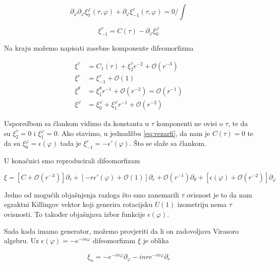 \begin{equation*}
\partial_\varphi\partial_\varphi\xi^\varphi_0(\tau,\varphi)+\partial_\varphi\xi^r_{-1}(\tau,\varphi)=0\Big/ \int
\end{equation*}

\begin{equation}
\xi^r_{-1}=C(\tau)-\partial_\varphi\xi^\varphi_0
\label{eq:vezarfi}
\end{equation}

\noindent Na kraju možemo napisati zasebne komponente difeomorfizma

\begin{equation}
\begin{split}
\xi^\tau&=C_1(\tau)+\xi^\tau_2r^{-2}+\mathcal{O}(r^{-3})\\
\xi^r&=\xi^r_{-1}+\mathcal{O}(1)\\
\xi^\theta&=\xi^\theta_1r^{-1}+\mathcal{O}(r^{-2})=\mathcal{O}(r^{-1})\\
\xi^\varphi&=\xi^\varphi_0+\xi^\varphi_1r^{-1}+\mathcal{O}(r^{-2})
\end{split}
\end{equation}

\noindent Usporedbom sa člankom \citep{Guica:2008mu} vidimo da konstanta u $\tau$ komponenti ne ovisi o $\tau$, te da su $\xi^\tau_2=0$ i $\xi^\varphi_1=0$. Ako stavimo, u jednadžbu \eqref{eq:vezarfi}, da nam je $C(\tau)=0$ te da su  $\xi^\varphi_0=\epsilon(\varphi)$ tada je $\xi^r_{-1}=-\epsilon'(\varphi)$. Što se slaže sa člankom. 

\noindent U konačnici smo reproducirali difeomorfizam

\begin{equation}
\xi=[C+\mathcal{O}(r^{-3})]\partial_\tau+[-r\epsilon'(\varphi)+\mathcal{O}(1)]\partial_r+\mathcal{O}(r^{-1})\partial_\theta+[\epsilon(\varphi)+\mathcal{O}(r^{-2})]\partial_\varphi
\end{equation}

\noindent Jedno od mogućih objašnjenja razloga što smo zanemarili $\tau$ ovisnost je to da nam egzaktni Killingov vektor koji generira rotacijsku $U(1)$ izometriju nema $\tau$ ovisnosti. To također objašnjava izbor funkcije $\epsilon(\varphi)$.

\noindent Sada kada imamo generator, možemo provjeriti da li on zadovoljava Virasoro algebru. Uz $\epsilon(\varphi)=-e^{-in\varphi}$ difeomorfizam $\xi$ je oblika

\begin{equation}
\xi_n=-e^{-in\varphi}\partial_\varphi-i n r e^{-in\varphi}\partial_r
\end{equation}


